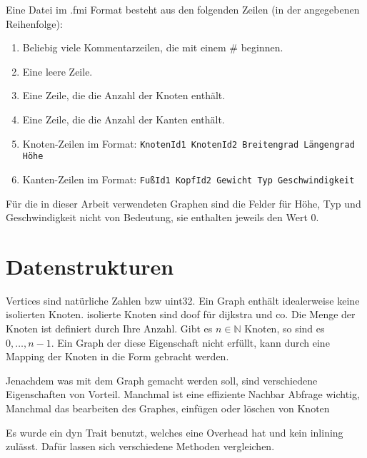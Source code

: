 \begin{definition}
    Eine Datei im .fmi Format besteht aus den folgenden Zeilen (in der angegebenen Reihenfolge):
    \begin{enumerate}
        \item
              Beliebig viele Kommentarzeilen, die mit einem \# beginnen.

        \item
              Eine leere Zeile.

        \item
              Eine Zeile, die die Anzahl der Knoten enthält.

        \item
              Eine Zeile, die die Anzahl der Kanten enthält.

        \item
              Knoten-Zeilen im Format: \texttt{KnotenId1 KnotenId2 Breitengrad Längengrad Höhe}

        \item
              Kanten-Zeilen im Format: \texttt{FußId1 KopfId2 Gewicht Typ Geschwindigkeit}

    \end{enumerate}
\end{definition}

Für die in dieser Arbeit verwendeten Graphen sind die Felder für Höhe, Typ und Geschwindigkeit nicht von Bedeutung, sie enthalten jeweils den Wert 0.

\section{Datenstrukturen}

Vertices sind natürliche Zahlen bzw uint32.
Ein Graph enthält idealerweise keine isolierten Knoten.
isolierte Knoten sind doof für dijkstra und co.
Die Menge der Knoten ist definiert durch Ihre Anzahl.
Gibt es $n \in \mathbb{N}$ Knoten, so sind es $0, \dotsc, n - 1$.
Ein Graph der diese Eigenschaft nicht erfüllt, kann durch eine Mapping der Knoten in die Form gebracht werden.

Jenachdem was mit dem Graph gemacht werden soll, sind verschiedene Eigenschaften von Vorteil.
Manchmal ist eine effiziente Nachbar Abfrage wichtig,
Manchmal das bearbeiten des Graphes, einfügen oder löschen von Knoten

Es wurde ein dyn Trait benutzt, welches eine Overhead hat und kein inlining zulässt.
Dafür lassen sich verschiedene Methoden vergleichen.

